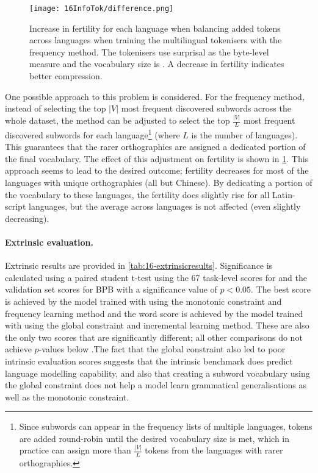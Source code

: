 \begin{figure}[!t]
    \centering
    \texttt{[image: 16InfoTok/difference.png]}
    \caption{Increase in fertility for each language when balancing added tokens across languages when training the multilingual \bytespan tokenisers with the frequency method. The tokenisers use surprisal as the byte-level measure and the vocabulary size is . A decrease in fertility indicates better compression.}
    \label{fig:16-difference}
\end{figure}

One possible approach to this problem is considered. For the frequency method, instead of selecting the top $|V|$ most frequent discovered subwords across the whole dataset, the method can be adjusted to select the top $\frac{|V|}{L}$ most frequent discovered subwords for each language\footnote{Since subwords can appear in the frequency lists of multiple languages, tokens are added round-robin until the desired vocabulary size is met, which in practice can assign more than $\frac{|V|}{L}$ tokens from the languages with rarer orthographies.} (where $L$ is the number of languages). This guarantees that the rarer orthographies are assigned a dedicated portion of the final vocabulary. The effect of this adjustment on fertility is shown in \cref{fig:16-difference}. This approach seems to lead to the desired outcome; fertility decreases for most of the languages with unique orthographies (all but Chinese). By dedicating a portion of the vocabulary to these languages, the fertility does slightly rise for all Latin-script languages, but the average across languages is not affected (even slightly decreasing). 

\paragraph{Extrinsic evaluation.}

Extrinsic results are provided in \cref{tab:16-extrinsicresults}. Significance is calculated using a paired student t-test using the 67 task-level scores for \blimp and the  validation set scores for BPB with a significance value of $p<0.05$. The best \blimp score is achieved by the model trained with \bytespan using the monotonic constraint and frequency learning method and the word score is achieved by the model trained with \bytespan using the global constraint and incremental learning method. These are also the only two scores that are significantly different; all other comparisons do not achieve $p$-values below .The fact that the global constraint also led to poor intrinsic evaluation scores suggests that the intrinsic benchmark does predict language modelling capability, and also that creating a subword vocabulary using the global constraint does not help a model learn grammatical generalisations as well as the monotonic constraint. 

